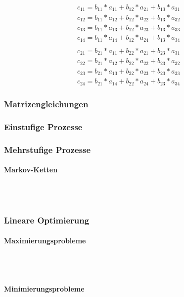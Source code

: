 \documentclass[a4paper]{article} %
\begin{document}
		\begin{align*}
		c_{11}=b_{11}*a_{11}+b_{12}*a_{21}+b_{13}*a_{31}\\
		c_{12}=b_{11}*a_{12}+b_{12}*a_{22}+b_{13}*a_{32}\\
		c_{13}=b_{11}*a_{13}+b_{12}*a_{23}+b_{13}*a_{33}\\
		c_{14}=b_{11}*a_{14}+b_{12}*a_{24}+b_{13}*a_{34} 
		\\\\
		c_{21}=b_{21}*a_{11}+b_{22}*a_{21}+b_{23}*a_{31}\\
		c_{22}=b_{21}*a_{12}+b_{22}*a_{22}+b_{23}*a_{32}\\
		c_{23}=b_{21}*a_{13}+b_{22}*a_{23}+b_{23}*a_{33}\\
		c_{24}=b_{21}*a_{14}+b_{22}*a_{24}+b_{23}*a_{34}
		\end{align*}



	\subsubsection{Matrizengleichungen}
	

	\subsubsection{Einstufige Prozesse}
	\subsubsection{Mehrstufige Prozesse}
	\paragraph{Markov-Ketten}
	\hspace{0 cm} \\ \noindent \\
	\subsubsection{Lineare Optimierung}
	\paragraph{Maximierungsprobleme}
	 \hspace{0 cm} \\ \noindent \\
	\paragraph{Minimierungsprobleme}
	 \hspace{0 cm} \\ \noindent \\
\end{document}
